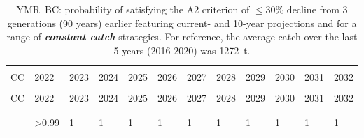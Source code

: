 \documentclass[11pt]{book}
\newcommand{\itbf}[1]{\textit{\textbf{#1}}}
\begin{document}
\begin{longtable}[c]{>{\raggedright\let\newline\\\arraybackslash\hspace{0pt}}p{0.49in}>{\raggedleft\let\newline\\\arraybackslash\hspace{0pt}}p{0.5in}>{\raggedleft\let\newline\\\arraybackslash\hspace{0pt}}p{0.5in}>{\raggedleft\let\newline\\\arraybackslash\hspace{0pt}}p{0.5in}>{\raggedleft\let\newline\\\arraybackslash\hspace{0pt}}p{0.5in}>{\raggedleft\let\newline\\\arraybackslash\hspace{0pt}}p{0.5in}>{\raggedleft\let\newline\\\arraybackslash\hspace{0pt}}p{0.5in}>{\raggedleft\let\newline\\\arraybackslash\hspace{0pt}}p{0.5in}>{\raggedleft\let\newline\\\arraybackslash\hspace{0pt}}p{0.5in}>{\raggedleft\let\newline\\\arraybackslash\hspace{0pt}}p{0.5in}>{\raggedleft\let\newline\\\arraybackslash\hspace{0pt}}p{0.5in}>{\raggedleft\let\newline\\\arraybackslash\hspace{0pt}}p{0.5in}}
  \caption{YMR~BC: probability of satisfying the A2 criterion of $\leq 30 \%$ decline from 3 generations (90 years) earlier featuring current- and 10-year projections and for a range of \itbf{constant catch} strategies.  For reference, the average catch over the last 5 years (2016-2020) was 1272~t. } \label{tab:ymr.cosewic.30Gen.CCs}\\  \hline\\[-2.2ex]  CC  & 2022 & 2023 & 2024 & 2025 & 2026 & 2027 & 2028 & 2029 & 2030 & 2031 & 2032 \\[0.2ex]\hline\\[-1.5ex]  \endfirsthead   \hline  CC  & 2022 & 2023 & 2024 & 2025 & 2026 & 2027 & 2028 & 2029 & 2030 & 2031 & 2032 \\[0.2ex]\hline\\[-1.5ex]  \endhead  \hline\\[-2.2ex]   \endfoot  \hline \endlastfoot  0 & >0.99 & 1 & 1 & 1 & 1 & 1 & 1 & 1 & 1 & 1 & 1 \\ 

\end{longtable}
\end{document}

